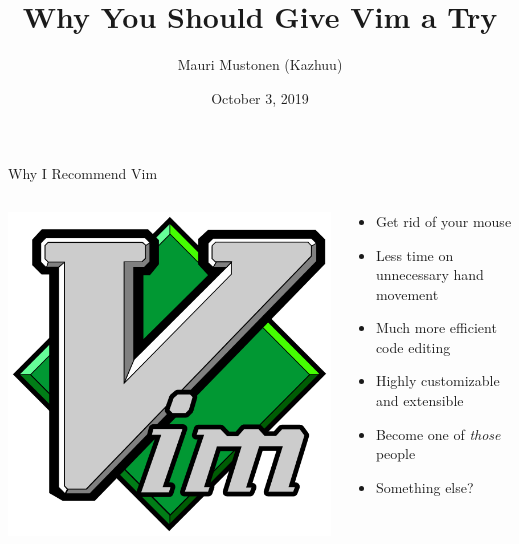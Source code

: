 \documentclass{beamer}
\title{Why You Should Give Vim a Try}
\author{Mauri Mustonen (Kazhuu)}
\date{October 3, 2019}
\begin{document}
\maketitle

\begin{frame}{Why I Recommend Vim}
    \begin{columns}
        \begin{column}{0.4\textwidth}
            \begin{center}
                \includegraphics[width=1\textwidth]{images/vim-logo.png}
            \end{center}
        \end{column}
        \begin{column}{0.6\textwidth}
            \begin{itemize}
                \item Get rid of your mouse
                \item Less time on unnecessary hand movement
                \item Much more efficient code editing
                \item Highly customizable and extensible
                \item Become one of \emph{those} people
                \item Something else?
            \end{itemize}
        \end{column}
    \end{columns}
\end{frame}
\end{document}

